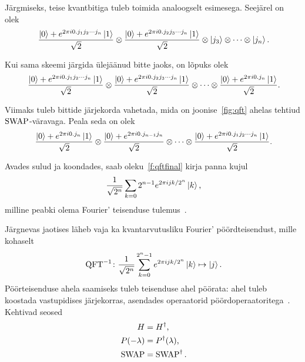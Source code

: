 \documentclass[12pt]{report}
\def\ket#1{\left|#1\right>}
\def\SWAP{\mathop{\rm SWAP}\nolimits}
\def\QFT{\mathop{\rm QFT}\nolimits}
\begin{document}
Järgmiseks, teise kvantbitiga tuleb toimida analoogselt esimesega.
Seejärel on olek
\begin{align}
    \frac{\ket{0} + e^{2\pi i0.j_1j_2\cdots j_n}\ket{1}}{\sqrt{2}}
    \otimes \frac{\ket{0} + e^{2\pi i0.j_2j_3\cdots j_n}\ket{1}}{\sqrt{2}}
    \otimes \ket{j_3} \otimes \cdots \otimes \ket{j_n} \rlap{.}
\end{align}

Kui sama skeemi järgida ülejäänud bitte jaoks, on lõpuks olek
\begin{align}
    \frac{\ket{0} + e^{2\pi i0.j_1j_2\cdots j_n}\ket{1}}{\sqrt{2}}
    \otimes \frac{\ket{0} + e^{2\pi i0.j_2j_3\cdots j_n}\ket{1}}{\sqrt{2}}
    \otimes \cdots
    \otimes \frac{\ket{0} + e^{2\pi i0.j_n}\ket{1}}{\sqrt{2}} \rlap{.}
\end{align}

Viimaks tuleb bittide järjekorda vahetada, mida on joonise~\ref{fig:qft} ahelas tehtiud \(\SWAP\)-väravaga.
Peala seda on olek
\begin{align}\label{f:qftfinal}
    \frac{\ket{0} + e^{2\pi i0.j_n}\ket{1}}{\sqrt{2}}
    \otimes \frac{\ket{0} + e^{2\pi i0.j_{n-1}j_n}}{\sqrt{2}}
    \otimes \cdots
    \otimes \frac{\ket{0} + e^{2\pi i0.j_1j_2\cdots j_n}\ket{1}}{\sqrt{2}} \rlap{.}
\end{align}

Avades sulud ja koondades, saab oleku~\ref{f:qftfinal} kirja panna kujul
\begin{equation}\label{f:qftfinaltrans}
    \frac{1}{\sqrt{2^n}}\sum_{k=0}2^{n-1}e^{2\pi ijk/2^n}\ket k \rlap{,}
\end{equation}
milline peabki olema Fourier' teisenduse tulemus~\cite{nielsen+chuang, kaye+laflamme+mosca}.

Järgnevas jaotises läheb vaja ka kvantarvutusliku Fourier' pöördteisendust, mille kohaselt
\begin{align}
    \QFT^{-1}\colon
    \frac{1}{\sqrt{2^n}} \sum_{k=0}^{2^n-1} e^{2\pi ijk/2^n} \ket{k} \mapsto \ket{j} \rlap{.}
\end{align}
Pöörteisenduse ahela saamiseks tuleb teisenduse ahel pöörata: ahel tuleb koostada vastupidises järjekorras, asendades operaatorid pöördoperaatoritega~\cite{kaye+laflamme+mosca}.
Kehtivad seosed
\begin{align}\label{f:iqftdef}
    H &= H^{\dagger} \rlap{,} \\
    P(-\lambda) &= P^{\dagger}(\lambda) \rlap{,} \\
    \SWAP &= \SWAP^{\dagger} \rlap{.}
\end{align}
\end{document}
